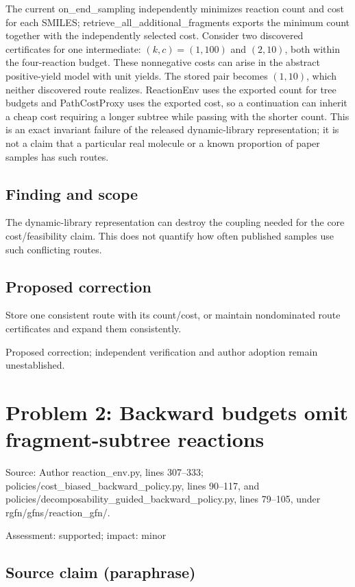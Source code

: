 \documentclass[11pt]{article}
\begin{document}
The current on\_end\_sampling independently minimizes reaction count and cost for each SMILES; retrieve\_all\_additional\_fragments exports the minimum count together with the independently selected cost. Consider two discovered certificates for one intermediate: \((k,c)=(1,100)\) and \((2,10)\), both within the four-reaction budget. These nonnegative costs can arise in the abstract positive-yield model with unit yields. The stored pair becomes \((1,10)\), which neither discovered route realizes. ReactionEnv uses the exported count for tree budgets and PathCostProxy uses the exported cost, so a continuation can inherit a cheap cost requiring a longer subtree while passing with the shorter count. This is an exact invariant failure of the released dynamic-library representation; it is not a claim that a particular real molecule or a known proportion of paper samples has such routes.

\subsection*{Finding and scope}

The dynamic-library representation can destroy the coupling needed for the core cost/feasibility claim. This does not quantify how often published samples use such conflicting routes.

\subsection*{Proposed correction}

Store one consistent route with its count/cost, or maintain nondominated route certificates and expand them consistently.

Proposed correction; independent verification and author adoption remain unestablished.

\section*{Problem 2: Backward budgets omit fragment-subtree reactions}

Source: Author reaction\_env.py, lines 307–333; policies/cost\_biased\_backward\_policy.py, lines 90–117, and policies/decomposability\_guided\_backward\_policy.py, lines 79–105, under rgfn/gfns/reaction\_gfn/.

Assessment: supported; impact: minor

\subsection*{Source claim (paraphrase)}
\end{document}
